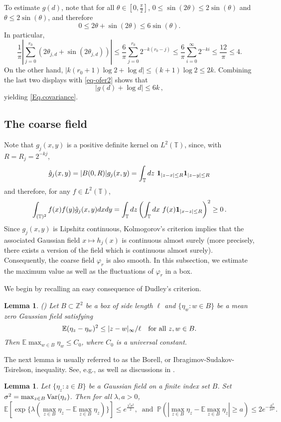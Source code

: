 \documentclass[11pt]{article}
\newtheorem{lemma}[theorem]{Lemma}
\theoremstyle{definition}
\def \E {{\mathbb{E}}}
\def \P {{\mathbb{P}}}
\def \T {{\mathbb{T}}}
\def \Var {{\rm Var}}
\def \s {\sigma}
\begin{document}
 To estimate $g(d)$, note that
for all $\theta \in [0, \frac \pi 2]$,
$0 \le \sin (2 \theta) \le 2\sin(\theta)$ and $\theta\leq 2\sin(\theta)$,
 and therefore
 \begin{equation} \label{Eq.COVtheta}
0 \le 2 \theta + \sin (2 \theta) \le  6\sin(\theta).
 \end{equation}
 In particular,
 $$
\frac1\pi |\sum_{j=0}^{r_0}(2\theta_{j,d}+ \sin(2\theta_{j,d}))| \leq \frac6\pi \sum_{j=0}^{r_0} 2^{ - k (r_0 - j)} \leq \frac6\pi \sum_{i=0}^\infty 2^{-ki} \leq \frac {12} \pi \le 4.
 $$
On the other hand, $|k(r_0+1)\log 2 + \log d|\leq (k+1)\log 2\leq 2 k$.
Combining the last two displays with \eqref{eq-ofer2} shows that
 $$
|g(d)+\log d|\leq 6 k \,,
 $$
yielding \eqref{Eq.covariance}.


\subsection{The coarse field}  \label{Section.coarsefield}
Note that $g_j(x,y)$ is a positive definite kernel on $L^2(\T)$,
since, with $R=R_j=2^{-{kj}}$,
$$\hat g_j(x,y)=|B(0,R)|g_j(x,y)=
\int_{\T} dz \ {\bf 1}_{|z - x|\leq R} {\bf 1}_{|z-y|\leq R}$$
and therefore,
for any $f\in L^2(\T)$,
 $$
\int_{(\T)^2} f(x)f(y) \hat g_j(x,y) dx dy = \int_{\T} dz \left(\int_{\T} dx \ f(x) {\bf 1}_{|x-z|\leq R}
\right)^2 \geq 0\,.
 $$
Since $g_j(x,y)$ is Lipshitz continuous, Kolmogorov's criterion implies that
the associated Gaussian field $x\mapsto h_j(x)$ is continuous almost surely (more precisely, there exists a version of the field which is continuous almost surely).
Consequently, the coarse field $\varphi_r$ is also smooth.
In this subsection, we estimate the maximum value as well
as the fluctuations of $\varphi_r$ in a box.

We begin by recalling an easy consequence of Dudley's criterion.
\begin{lemma}\label{Lem.maxinbox}
(\cite[Theorem 4.1]{A90}) Let $B \subset \mathbb{Z}^2$ be a box of side length $\ell$ and $\{ \eta_w : w \in B \}$ be a mean zero Gaussian field satisfying
 $$
\E (\eta_z - \eta_w)^2 \le |z-w|_\infty / \ell \ \ \ {\rm for \ all \ } z,w \in B.
 $$
Then $\E \max_{w \in B} \eta_w \le C_0$, where $C_0$ is a universal constant.
 \end{lemma}
 The next lemma is usually referred to as the Borell, or
 Ibragimov-Sudakov-Tsirelson, inequality. See,  e.g., \cite[(7.4), (2.26)]{L01} as well as discussions in \cite[Page 61]{L01}.
 \begin{lemma} \label{Lem.concentration}
Let $\{ \eta_z : z \in B \}$ be a Gaussian field on a finite index set $B$. Set $\s^2 = \max_{z \in B} \Var (\eta_z)$. Then for all $\lambda, a > 0$,
 $$
\E[ \exp\{\lambda (\max_{z \in B} \eta_z - \E \max_{z \in B} \eta_z)\} ]\leq e^{\frac{\lambda^2 \sigma^2}{2}} , \ \mbox{ and } \ \P (| \max_{z \in B} \eta_z - \E \max_{z \in B} \eta_z | \ge a) \le 2 e^{-\frac {a^2}{2 \s^2}} .
 $$

 \end{lemma}
\end{document}
